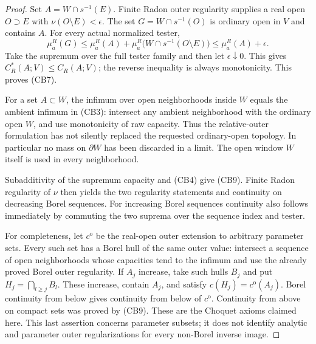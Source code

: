\documentclass[11pt,a4paper]{article}
\numberwithin{equation}{section}
\theoremstyle{definition}
\theoremstyle{remark}
\begin{document}
\begin{proof}
Set $A=W\cap s^{-1}(E)$. Finite Radon outer regularity supplies
a real open $O\supset E$ with $\nu(O\setminus E)<\epsilon$.
The set $G=W\cap s^{-1}(O)$ is ordinary open in $V$ and
contains $A$. For every actual normalized tester,
\[
 \mu^R_a(G)
    \leq\mu^R_a(A)+\mu^R_a\bigl(W\cap s^{-1}(O\setminus E)\bigr)
    \leq\mu^R_a(A)+\epsilon.
 \tag{CB10}
\]
Take the supremum over the full tester family and then let
$\epsilon\downarrow0$. This gives $C_R^*(A;V)\leq C_R(A;V)$;
the reverse inequality is always monotonicity. This proves (CB7).

For a set $A\subset W$, the infimum over open neighborhoods
inside $W$ equals the ambient infimum in (CB3): intersect any
ambient neighborhood with the ordinary open $W$, and use
monotonicity of raw capacity. Thus the relative-outer formulation
has not silently replaced the requested ordinary-open topology.
In particular no mass on $\partial W$ has been discarded in a
limit. The open window $W$ itself is used in every neighborhood.

Subadditivity of the supremum capacity and (CB4) give (CB9).
Finite Radon regularity of $\nu$ then yields the two regularity
statements and continuity on decreasing Borel sequences. For
increasing Borel sequences continuity also follows immediately
by commuting the two suprema over the sequence index and tester.

For completeness, let $c^{\mathrm o}$ be the real-open outer
extension to arbitrary parameter sets. Every such set has a Borel
hull of the same outer value: intersect a sequence of open
neighborhoods whose capacities tend to the infimum and use the
already proved Borel outer regularity. If $A_j$ increase, take
such hulls $B_j$ and put $H_j=\bigcap_{l\geq j}B_l$. These
increase, contain $A_j$, and satisfy
$c(H_j)=c^{\mathrm o}(A_j)$. Borel continuity from below gives
continuity from below of $c^{\mathrm o}$. Continuity from above
on compact sets was proved by (CB9). These are the Choquet
axioms claimed here. This last assertion concerns parameter
subsets; it does not identify analytic and parameter outer
regularizations for every non-Borel inverse image.
\end{proof}
\end{document}
